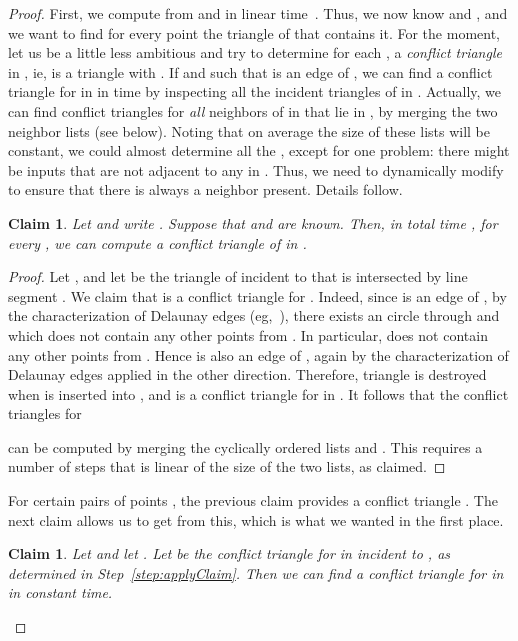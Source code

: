 \documentclass{siamltex}
\newtheorem{claim}[theorem]{Claim}
\begin{document}
\begin{proof}
First, we compute  from  and  in linear 
time~\cite{C,Kirkpatrick79}. Thus, we now know  and
, and we want to find for every point  the
triangle  of  that contains it.
For the moment, let us be a little less ambitious and
try to determine for each , a \emph{conflict triangle}
 in , ie,  is a triangle  with 
.
If  and  such that
 is an edge of , we can find
a conflict triangle for  in  in 
time  by inspecting all the incident triangles of
 in . Actually, we can find
conflict triangles for \emph{all} neighbors
of  in  that lie in , by
merging the two neighbor lists (see below).
Noting that on average the size of these lists 
will be constant, we could almost determine
all the , except for one problem:
there might be inputs  that are not 
adjacent to any  in .
Thus, we need to dynamically modify 
to ensure that there is always a neighbor present.
Details follow.
\begin{claim}\label{clm:neighborfacets}
Let  and write . Suppose 
that  and  are known.  
Then,
in total time ,
for every ,
we can compute a conflict triangle  of  in 
.
\end{claim}

\begin{proof}
Let ,
and let  be the triangle of  incident to  that
is intersected by line segment . We claim that 
 is
a conflict triangle for . Indeed, since  is an edge
of , by the characterization of Delaunay edges 
(eg,~\cite[Theorem~9.6(ii)]{deBergKrOvSc00}), there exists an circle 
 through  
and  which does not contain any other points from 
. In particular,  does not contain any other
points from . Hence  is also an edge
of , again by the characterization of Delaunay
edges applied in the other direction. Therefore, triangle 
 is
destroyed when  is inserted into , and is
a conflict triangle for  in .
It follows that the conflict triangles for 
 
can be
computed by merging the cyclically ordered lists  and 
. This requires a number of steps that is linear of 
the size of the two lists, as claimed.
\end{proof}

For certain pairs of points , the previous claim provides
a conflict triangle . The next claim allows us
to get  from this, which is what we wanted
in the first place.

\begin{claim}\label{clm:conflict}
Let  and let . Let  be the conflict
triangle for  in  incident to , as determined in 
Step~\ref{step:applyClaim}. Then we can find
a conflict triangle  for  in  in constant time.
\end{claim}


\end{proof}
\end{document}
